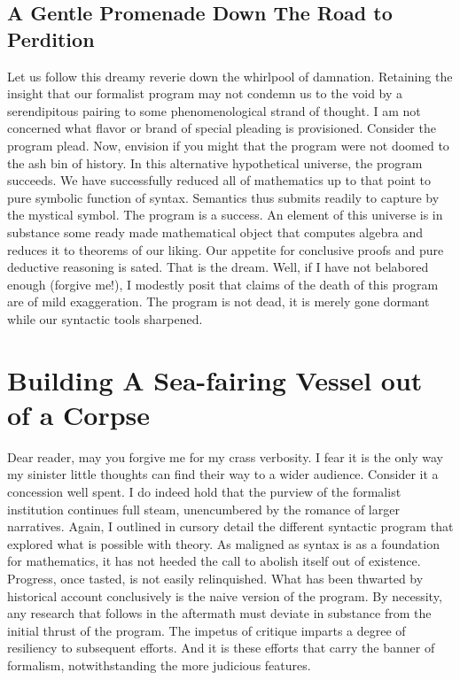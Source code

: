 \documentclass[12pt]{article}
\begin{document}
\subsection{A Gentle Promenade Down The Road to Perdition}
Let us follow this dreamy reverie down the whirlpool of damnation. Retaining
the insight that our formalist program may not condemn us to the void by a
serendipitous pairing to some phenomenological strand of thought. I am not
concerned what flavor or brand of special pleading is provisioned. Consider the
program plead. Now, envision if you might that the program were not doomed to
the ash bin of history. In this alternative hypothetical universe, the program
succeeds. We have successfully reduced all of mathematics up to that point to
pure symbolic function of syntax. Semantics thus submits readily to capture by
the mystical symbol. The program is a success. An element of this universe is
in substance some ready made mathematical object that computes algebra and
reduces it to theorems of our liking. Our appetite for conclusive proofs and
pure deductive reasoning is sated. That is the dream. Well, if I have not
belabored enough (forgive me!), I modestly posit that claims of the death of
this program are of mild exaggeration. The program is not dead, it is merely
gone dormant while our syntactic tools sharpened.

\section{Building A Sea-fairing Vessel out of a Corpse}
Dear reader, may you forgive me for my crass verbosity. I fear it is the only
way my sinister little thoughts can find their way to a wider audience.
Consider it a concession well spent. I do indeed hold that the purview of the
formalist institution continues full steam, unencumbered by the romance of
larger narratives. Again, I outlined in cursory detail the different syntactic
program that explored what is possible with theory. As maligned as syntax is as
a foundation for mathematics, it has not heeded the call to abolish itself out
of existence. Progress, once tasted, is not easily relinquished. What has been
thwarted by historical account conclusively is the naive version of the
program. By necessity, any research that follows in the aftermath must deviate
in substance from the initial thrust of the program. The impetus of critique
imparts a degree of resiliency to subsequent efforts. And it is these efforts
that carry the banner of formalism, notwithstanding the more judicious
features.
\end{document}
